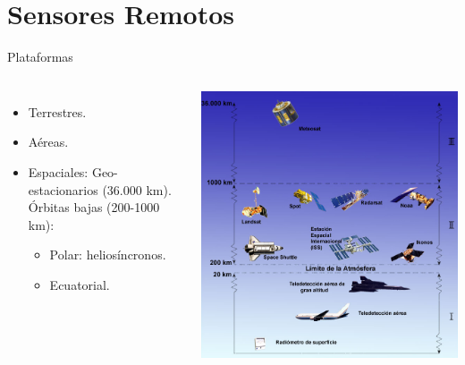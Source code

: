 \documentclass{beamer}
\begin{document}
\section{Sensores Remotos}

\begin{frame}{Plataformas}
	\begin{columns}
		\begin{itemize}
			\item Terrestres.
			\item Aéreas.
			\item Espaciales:
			Geo-estacionarios (36.000 km).
			Órbitas bajas (200-1000 km):
			\begin{itemize}
				\item Polar: heliosíncronos.
				\item Ecuatorial.
			\end{itemize}
		\end{itemize}
		\includegraphics[width=1\textwidth]{IMGs/plataforma}
	\end{columns}
\end{frame}
\end{document}

